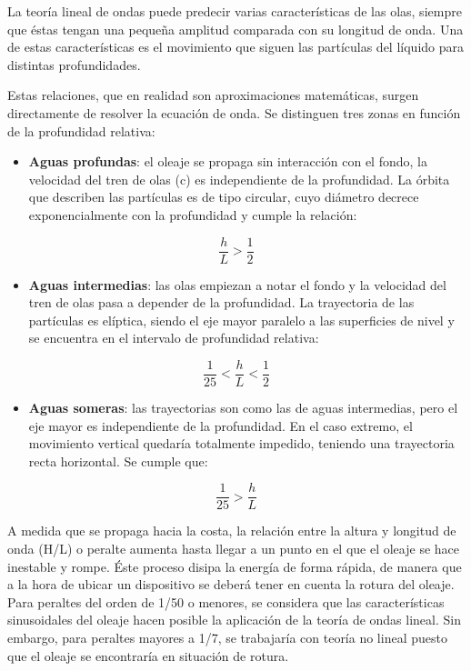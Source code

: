 La teoría lineal de ondas puede predecir varias características de las
olas, siempre que éstas tengan una pequeña amplitud comparada con su
longitud de onda. Una de estas características es el movimiento que
siguen las partículas del líquido para distintas profundidades.

Estas relaciones, que en realidad son aproximaciones matemáticas, surgen
directamente de resolver la ecuación de onda. Se distinguen tres zonas
en función de la profundidad relativa:

\begin{itemize}
\item
  \textbf{Aguas profundas}: el oleaje se propaga sin interacción con el
  fondo, la velocidad del tren de olas (c) es independiente de la
  profundidad. La órbita que describen las partículas es de tipo
  circular, cuyo diámetro decrece exponencialmente con la profundidad y
  cumple la relación: 
\end{itemize}

\[\frac{h}{L}>\frac{1}{2}\]

\begin{itemize}
\item
  \textbf{Aguas intermedias}: las olas empiezan a notar el fondo y la
  velocidad del tren de olas pasa a depender de la profundidad. La
  trayectoria de las partículas es elíptica, siendo el eje mayor
  paralelo a las superficies de nivel y se encuentra en el intervalo de
  profundidad relativa:
\end{itemize}

\[\frac{1}{25}<\frac{h}{L}<\frac{1}{2}\]

\begin{itemize}
\item
  \textbf{Aguas someras}: las trayectorias son como las de aguas
  intermedias, pero el eje mayor es independiente de la profundidad. En
  el caso extremo, el movimiento vertical quedaría totalmente impedido,
  teniendo una trayectoria recta horizontal. Se cumple que:
\end{itemize}

\[\frac{1}{25}>\frac{h}{L}\]

A medida que se propaga hacia la costa, la relación entre la altura y
longitud de onda (H/L) o peralte aumenta hasta llegar a un punto en el
que el oleaje se hace inestable y rompe. Éste proceso disipa la energía
de forma rápida, de manera que a la hora de ubicar un dispositivo se
deberá tener en cuenta la rotura del oleaje. Para peraltes del orden de
1/50 o menores, se considera que las características sinusoidales del
oleaje hacen posible la aplicación de la teoría de ondas lineal. Sin
embargo, para peraltes mayores a 1/7, se trabajaría con teoría no lineal
puesto que el oleaje se encontraría en situación de rotura.

